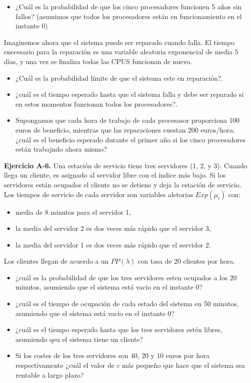 \documentclass[
]{book}
\providecommand{\tightlist}{%
  \setlength{\itemsep}{0pt}\setlength{\parskip}{0pt}}
\theoremstyle{definition}
\theoremstyle{definition}
\theoremstyle{definition}
\theoremstyle{definition}
\theoremstyle{remark}
\begin{document}
\begin{itemize}
\tightlist
\item
  ¿Cuál es la probabilidad de que los cinco procesadores funcionen 5 años sin fallos? (asumimos que todos los procesadores están en funcionamiento en el instante 0)
\end{itemize}

Imaginemos ahora que el sistema puede ser reparado cuando falla. El tiempo enecesario para la reparación es una variable aleatoria exponencial de media 5 días, y una vez se finaliza todas las CPUS funcionan de nuevo.

\begin{itemize}
\tightlist
\item
  ¿Cuál es la probabilidad límite de que el sistema este en reparación?.
\item
  ¿cuál es el tiempo esperado hasta que el sistema falla y debe ser reparado si en estos momentos funcionan todos los procesadores?.
\item
  Supongamos que cada hora de trabajo de cada procesasor proporciona 100 euros de beneficio, mientras que las reparaciones cuestan 200 euros/hora. ¿cuál es el beneficio esperado durante el primer año si los cinco procesadores están trabajndo ahora mismo?
\end{itemize}

\textbf{Ejercicio A-6.} Una estación de servicio tiene tres servidores (1, 2, y 3). Cuando llega un cliente, es asignado al servidor libre con el índice más bajo. Si los servidores están ocupados el cliente no se detiene y deja la estación de servicio. Los tiempos de servicio de cada servidor son variables aletorias \(Exp(\mu_i)\) con:

\begin{itemize}
\tightlist
\item
  media de 8 minutos para el servidor 1,\\
\item
  la media del servidor 2 es dos veces más rápido que el servidor 3,
\item
  la media del servidor 1 es dos veces más rápido que el servidor 2.
\end{itemize}

Los clientes llegan de acuerdo a un \(PP(\lambda)\) con tasa de 20 clientes por hora.

\begin{itemize}
\tightlist
\item
  ¿cuál es la probabilidad de que los tres servidores esten ocupados a los 20 minutos, asumiendo que el sistema está vacio en el instante 0?
\item
  ¿cuál es el tiempo de ocupación de cada estado del sistema en 50 minutos, asumiendo que el sistema está vacio en el instante 0?
\item
  ¿cuál es el tiempo esperado hasta que los tres servidores estén libres, asumiendo qeu el sistema tiene un cliente?
\item
  Si los costes de los tres servidores son 40, 20 y 10 euros por hora respectivamente ¿cuál el valor de \(c\) más pequeño que hace que el sistema sea rentable a largo plazo?
\end{itemize}
\end{document}
